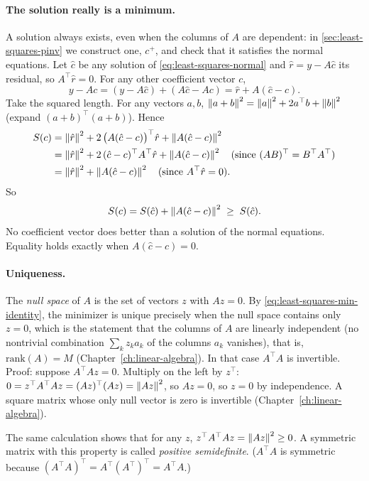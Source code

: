 \paragraph{The solution really is a minimum.} A solution always exists, even when the columns of $A$ are dependent: in \cref{sec:least-squares-pinv} we construct one, $c^+$, and check that it satisfies the normal equations. Let $\hat c$ be any solution of \cref{eq:least-squares-normal} and $\hat r = y - A\hat c$ its residual, so $A^\top \hat r = 0$. For any other coefficient vector $c$,
\[
y - Ac = (y - A\hat c) + (A\hat c - Ac) = \hat r + A(\hat c - c).
\]
Take the squared length. For any vectors $a,b$, $\left\lVert a+b\right\rVert^2 = \left\lVert a\right\rVert^2 + 2a^\top b + \left\lVert b\right\rVert^2$ (expand $(a+b)^\top(a+b)$). Hence
\begin{align*}
S(c) &= \left\lVert \hat r\right\rVert^2 + 2\,\bigl(A(\hat c - c)\bigr)^\top \hat r + \left\lVert A(\hat c - c)\right\rVert^2\\
&= \left\lVert \hat r\right\rVert^2 + 2\,(\hat c - c)^\top A^\top \hat r + \left\lVert A(\hat c - c)\right\rVert^2 \quad\text{(since } (AB)^\top = B^\top A^\top)\\
&= \left\lVert \hat r\right\rVert^2 + \left\lVert A(\hat c - c)\right\rVert^2 \quad\text{(since } A^\top \hat r = 0).
\end{align*}
So
\begin{equation}
S(c) = S(\hat c) + \left\lVert A(\hat c - c)\right\rVert^2 \;\ge\; S(\hat c).
\label{eq:least-squares-min-identity}
\end{equation}
No coefficient vector does better than a solution of the normal equations. Equality holds exactly when $A(\hat c - c) = 0$.

\paragraph{Uniqueness.} The \emph{null space} of $A$ is the set of vectors $z$ with $Az = 0$. By \cref{eq:least-squares-min-identity}, the minimizer is unique precisely when the null space contains only $z=0$, which is the statement that the columns of $A$ are linearly independent (no nontrivial combination $\sum_k z_k a_k$ of the columns $a_k$ vanishes), that is, $\mathrm{rank}(A) = M$ (Chapter~\ref{ch:linear-algebra}). In that case $A^\top A$ is invertible. Proof: suppose $A^\top A z = 0$. Multiply on the left by $z^\top$: $0 = z^\top A^\top A z = (Az)^\top (Az) = \left\lVert Az\right\rVert^2$, so $Az = 0$, so $z=0$ by independence. A square matrix whose only null vector is zero is invertible (Chapter~\ref{ch:linear-algebra}).

The same calculation shows that for any $z$, $z^\top A^\top A z = \left\lVert Az\right\rVert^2 \ge 0$. A symmetric matrix with this property is called \emph{positive semidefinite}. ($A^\top A$ is symmetric because $(A^\top A)^\top = A^\top (A^\top)^\top = A^\top A$.)

